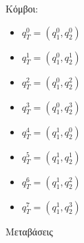 Κόμβοι:
\reducevspace\reducevspace\reducevspace\reducevspace\reducevspace\reducevspace\reducevspace
\begin{multicols}{4}
\begin{itemize}
	\itemsep0em
	\item $q_T^{0} = (q_1^{0}, q_2^{0})$
	\item $q_T^{1} = (q_1^{0}, q_2^{1})$

	\item $q_T^{2} = (q_1^{0}, q_2^{2})$
	\item $q_T^{3} = (q_1^{0}, q_2^{3})$

	\item $q_T^{4} = (q_1^{1}, q_2^{0})$
	\item $q_T^{5} = (q_1^{1}, q_2^{1})$

	\item $q_T^{6} = (q_1^{1}, q_2^{2})$
	\item $q_T^{7} = (q_1^{1}, q_2^{3})$
\end{itemize}
\end{multicols}
\reducevspace\reducevspace\reducevspace\reducevspace\reducevspace\reducevspace\reducevspace
\par Μεταβάσεις
\reducevspace\reducevspace\reducevspace\reducevspace\reducevspace\reducevspace\reducevspace
